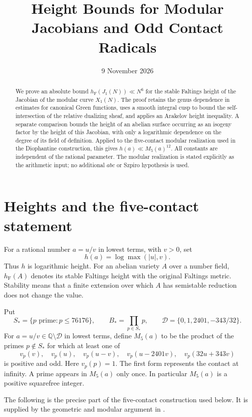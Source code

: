 \documentclass[11pt,a4paper]{article}
\title{Height Bounds for Modular Jacobians and Odd Contact Radicals}
\author{}
\date{9 November 2026}
\theoremstyle{definition}
\newcommand{\Q}{\mathbb Q}
\newcommand{\hF}{h_{\mathrm F}}
\begin{document}
\maketitle
\begin{abstract}
We prove an absolute bound $\hF(J_1(N))\ll N^6$ for the stable
Faltings height of the Jacobian of the modular curve $X_1(N)$.
The proof retains the genus dependence in estimates for canonical
Green functions, uses a smooth integral cusp to bound the
self-intersection of the relative dualizing sheaf, and applies an
Arakelov height inequality. A separate comparison bounds the height
of an abelian surface occurring as an isogeny factor by the height of
this Jacobian, with only a logarithmic dependence on the degree of
its field of definition. Applied to the five-contact modular
realization used in the Diophantine construction, this gives
$h(a)\ll M_5(a)^{12}$. All constants are independent of the rational
parameter. The modular realization is stated explicitly as the
arithmetic input; no additional $abc$ or Szpiro hypothesis is used.
\end{abstract}

\section{Heights and the five-contact statement}

For a rational number $a=u/v$ in lowest terms, with $v>0$, set
\[
 h(a)=\log\max(|u|,v).
\]
Thus $h$ is logarithmic height. For an abelian variety $A$ over a
number field, $\hF(A)$ denotes its stable Faltings height with the
original Faltings metric. Stability means that a finite extension
over which $A$ has semistable reduction does not change the value.

Put
\[
 S_* =\{p\text{ prime}:p\le76176\},\qquad
 B_* =\prod_{p\in S_*}p,\qquad
 \mathcal D=\{0,1,2401,-343/32\}.
\]
For $a=u/v\in\Q\setminus\mathcal D$ in lowest terms, define
$M_5(a)$ to be the product of the primes $p\notin S_*$ for which
at least one of
\begin{equation}\label{eq:contact-forms}
 v_p(v),\quad v_p(u),\quad v_p(u-v),\quad
 v_p(u-2401v),\quad v_p(32u+343v)
\end{equation}
is positive and odd. Here $v_p(p)=1$. The first form represents
the contact at infinity. A prime appears in $M_5(a)$ only once.
In particular $M_5(a)$ is a positive squarefree integer.

The following is the precise part of the five-contact construction
used below. It is supplied by the geometric and modular argument in
\cite[proof of Theorem \texttt{o8-height}, equations
\textup{(LR3)--(LR5)}, and proof of Theorem
\texttt{quartic-height19}]{Glazer}.
\end{document}

